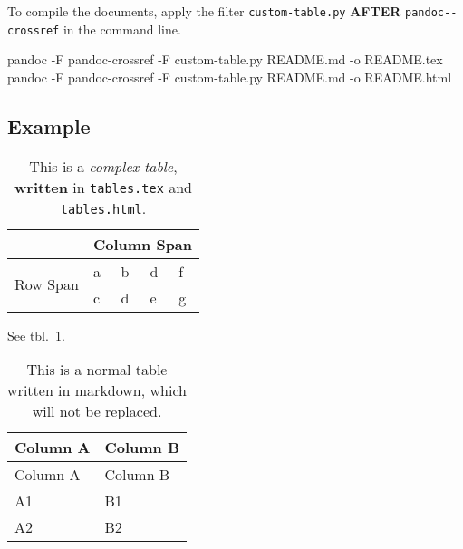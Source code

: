 \documentclass[
]{article}
\newenvironment{Shaded}{}{}
\newcommand{\AttributeTok}[1]{\textcolor[rgb]{0.49,0.56,0.16}{#1}}
\newcommand{\ExtensionTok}[1]{#1}
\newcommand{\NormalTok}[1]{#1}
\begin{document}
To compile the documents, apply the filter \texttt{custom-table.py}
\textbf{AFTER} \texttt{pandoc-\/-crossref} in the command line.

\begin{Shaded}
\begin{Highlighting}[]
\ExtensionTok{pandoc} \AttributeTok{{-}F}\NormalTok{ pandoc{-}crossref }\AttributeTok{{-}F}\NormalTok{ custom{-}table.py README.md }\AttributeTok{{-}o}\NormalTok{ README.tex}
\ExtensionTok{pandoc} \AttributeTok{{-}F}\NormalTok{ pandoc{-}crossref }\AttributeTok{{-}F}\NormalTok{ custom{-}table.py README.md }\AttributeTok{{-}o}\NormalTok{ README.html}
\end{Highlighting}
\end{Shaded}

\hypertarget{example}{%
\subsection{Example}\label{example}}

\begin{table}[]
    \caption{\label{tbl:custom-table}This is a \emph{complex table}, \textbf{written} in \texttt{tables.tex} and \texttt{tables.html}.}
\begin{tabular}{lllll}
    \hline
    \textbf{} & \multicolumn{4}{l}{Column Span} \\ \hline
    \multirow{2}{*}{Row Span} & a & b & d & f \\
     & c & d & e & g \\ \hline
    \end{tabular}
\end{table}

See tbl.~\ref{tbl:custom-table}.

\hypertarget{tbl:normal-table}{}
\begin{longtable}[]{@{}ll@{}}
\caption{\label{tbl:normal-table}This is a normal table written in
markdown, which will not be replaced.}\tabularnewline
\toprule
Column A & Column B \\
\midrule
\endfirsthead
\toprule
Column A & Column B \\
\midrule
\endhead
A1 & B1 \\
A2 & B2 \\
\bottomrule
\end{longtable}
\end{document}
